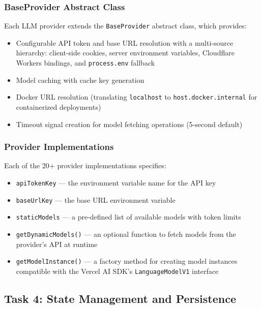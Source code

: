 \documentclass[12pt,a4paper,openany]{report}
\begin{document}
\subsubsection{BaseProvider Abstract Class}
Each LLM provider extends the \texttt{BaseProvider} abstract class, which provides:
\begin{itemize}
    \item Configurable API token and base URL resolution with a multi-source hierarchy: client-side cookies, server environment variables, Cloudflare Workers bindings, and \texttt{process.env} fallback
    \item Model caching with cache key generation
    \item Docker URL resolution (translating \texttt{localhost} to \texttt{host.docker.internal} for containerized deployments)
    \item Timeout signal creation for model fetching operations (5-second default)
\end{itemize}

\subsubsection{Provider Implementations}
Each of the 20+ provider implementations specifies:
\begin{itemize}
    \item \texttt{apiTokenKey} --- the environment variable name for the API key
    \item \texttt{baseUrlKey} --- the base URL environment variable
    \item \texttt{staticModels} --- a pre-defined list of available models with token limits
    \item \texttt{getDynamicModels()} --- an optional function to fetch models from the provider's API at runtime
    \item \texttt{getModelInstance()} --- a factory method for creating model instances compatible with the Vercel AI SDK's \texttt{LanguageModelV1} interface
\end{itemize}

\subsection{Task 4: State Management and Persistence}
\end{document}
